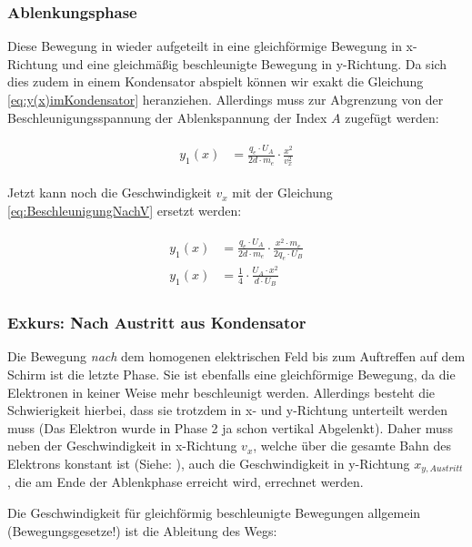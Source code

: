 \subsubsection{Ablenkungsphase}

Diese Bewegung in wieder aufgeteilt in eine gleichförmige Bewegung in x-Richtung und eine gleichmäßig beschleunigte Bewegung in y-Richtung. Da sich dies zudem in einem Kondensator abspielt können wir exakt die Gleichung \ref{eq:y(x)imKondensator} heranziehen. Allerdings muss zur Abgrenzung von der Beschleunigungsspannung der Ablenkspannung der Index $A$ zugefügt werden:

\begin{align} \label{eq:y_1(x)Braun}
\begin{split}
	y_1(x) &= \frac{q_e \cdot U_A}{2d \cdot m_e} \cdot \frac{x^2}{v_{x}^2}
\end{split}
\end{align}

Jetzt kann noch die Geschwindigkeit $v_{x}$ mit der Gleichung \ref{eq:BeschleunigungNachV} ersetzt werden:

\begin{align} \label{eq:y_1(x)BraunMitV}
\begin{split}
	y_1(x) &= \frac{q_e \cdot U_A}{2d \cdot m_e} \cdot \frac{x^2 \cdot m_e}{2q_e \cdot U_B} \\
	y_1(x) &= \frac{1}{4} \cdot \frac{U_A \cdot x^2}{d \cdot U_B}
\end{split}
\end{align}


\subsubsection{Exkurs: Nach Austritt aus Kondensator}

Die Bewegung \emph{nach} dem homogenen elektrischen Feld bis zum Auftreffen auf dem Schirm ist die letzte Phase. Sie ist ebenfalls eine gleichförmige Bewegung, da die Elektronen in keiner Weise mehr beschleunigt werden. Allerdings besteht die Schwierigkeit hierbei, dass sie trotzdem in x- und y-Richtung unterteilt werden muss (Das Elektron wurde in Phase 2 ja schon vertikal Abgelenkt). Daher muss neben der Geschwindigkeit in x-Richtung $v_x$, welche über die gesamte Bahn des Elektrons konstant ist (Siehe: ), auch die Geschwindigkeit in y-Richtung $x_{y,Austritt}$, die am Ende der Ablenkphase erreicht wird, errechnet werden. 

Die Geschwindigkeit für gleichförmig beschleunigte Bewegungen allgemein (Bewegungsgesetze!) ist die Ableitung des Wegs:

